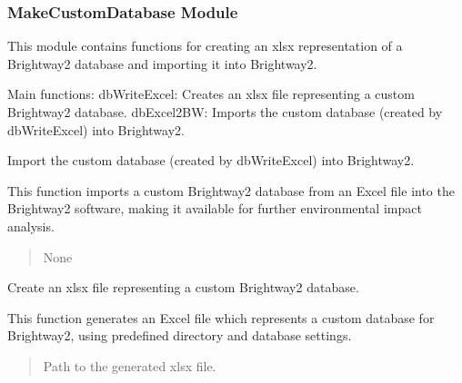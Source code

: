 \documentclass[letterpaper,10pt,english]{sphinxmanual}
\begin{document}
\subsubsection{MakeCustomDatabase Module}
\label{\detokenize{WasteAndMaterialFootprint:makecustomdatabase-module}}
\sphinxAtStartPar
This module contains functions for creating an xlsx representation of a Brightway2 database 
and importing it into Brightway2.

\sphinxAtStartPar
Main functions:
\sphinxhyphen{} dbWriteExcel: Creates an xlsx file representing a custom Brightway2 database.
\sphinxhyphen{} dbExcel2BW: Imports the custom database (created by dbWriteExcel) into Brightway2.

\begin{fulllineitems}
\label{\detokenize{WasteAndMaterialFootprint:WasteAndMaterialFootprint.MakeCustomDatabase.dbExcel2BW}}
\pysigstartsignatures
{}
\pysigstopsignatures
\sphinxAtStartPar
Import the custom database (created by dbWriteExcel) into Brightway2.

\sphinxAtStartPar
This function imports a custom Brightway2 database from an Excel file into the Brightway2 software,
making it available for further environmental impact analysis.
\begin{quote}\begin{description}
\sphinxAtStartPar
None

\end{description}\end{quote}

\end{fulllineitems}


\begin{fulllineitems}
\label{\detokenize{WasteAndMaterialFootprint:WasteAndMaterialFootprint.MakeCustomDatabase.dbWriteExcel}}
\pysigstartsignatures
{}
\pysigstopsignatures
\sphinxAtStartPar
Create an xlsx file representing a custom Brightway2 database.

\sphinxAtStartPar
This function generates an Excel file which represents a custom database for Brightway2,
using predefined directory and database settings.
\begin{quote}\begin{description}
\sphinxAtStartPar
Path to the generated xlsx file.

\end{description}\end{quote}

\end{fulllineitems}
\end{document}
